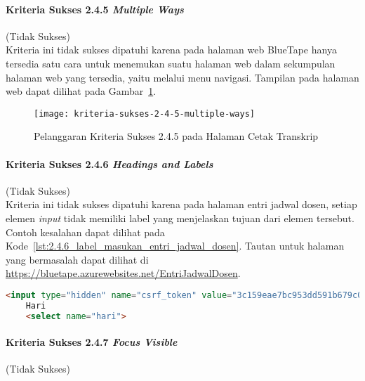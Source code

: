 \paragraph{Kriteria Sukses 2.4.5 \textit{Multiple Ways}}
\label{par:kepatuhan_bluetape_kriteria_sukses_2.4.5}
(Tidak Sukses)\\

Kriteria ini tidak sukses dipatuhi karena pada halaman web BlueTape hanya tersedia satu cara untuk menemukan suatu halaman web dalam sekumpulan halaman web yang tersedia, yaitu melalui menu navigasi. Tampilan pada halaman web dapat dilihat pada \mbox{Gambar \ref{fig:2.4.5_multiple_ways}}.

\begin{figure}[H]
    \centering  
    \texttt{[image: kriteria-sukses-2-4-5-multiple-ways]}  
    \caption[Pelanggaran Kriteria Sukses 2.4.5 pada Halaman Cetak Transkrip]{Pelanggaran Kriteria Sukses 2.4.5 pada Halaman Cetak Transkrip}
    \label{fig:2.4.5_multiple_ways}  
\end{figure}

\paragraph{Kriteria Sukses 2.4.6 \textit{Headings and Labels}}
\label{par:kepatuhan_bluetape_kriteria_sukses_2.4.6}
(Tidak Sukses)\\

Kriteria ini tidak sukses dipatuhi karena pada halaman entri jadwal dosen, setiap elemen \textit{input} tidak memiliki label yang menjelaskan tujuan dari elemen tersebut. Contoh kesalahan dapat dilihat pada \mbox{Kode \ref{lst:2.4.6_label_masukan_entri_jadwal_dosen}}. Tautan untuk halaman yang bermasalah dapat dilihat di \mbox{\url{https://bluetape.azurewebsites.net/EntriJadwalDosen}}.

\newpage

\begin{lstlisting}[frame=single, label={lst:2.4.6_label_masukan_entri_jadwal_dosen}, language=HTML, caption=Pelanggaran Kriteria Sukses 2.4.6 pada Halaman Entri Jadwal Dosen]
    <input type="hidden" name="csrf_token" value="3c159eae7bc953dd591b679c080ed066"/>
    Hari
    <select name="hari">
\end{lstlisting}

\paragraph{Kriteria Sukses 2.4.7 \textit{Focus Visible}}
\label{par:kepatuhan_bluetape_kriteria_sukses_2.4.7}
(Tidak Sukses)\\

